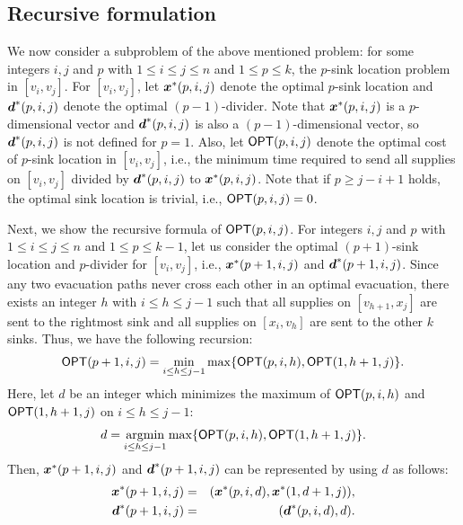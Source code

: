 \documentclass[a4paper]{llncs}
\newcommand{\bm}[1]{\mbox{\boldmath{$#1$}}}
\newcommand{\argmin}{\operatornamewithlimits{argmin}}
\begin{document}
\subsection{Recursive formulation}
We now consider a subproblem of the above mentioned problem:
for some integers $i, j$ and $p$ with $1 \le i \le j \le n$ and $1 \le p \le k$, the $p$-sink location problem in $[v_i, v_j]$.
For $[v_i, v_j]$, let ${\bm x}^*(p, i, j)$ denote the optimal $p$-sink location and ${\bm d}^*(p, i, j)$ denote the optimal $(p-1)$-divider.
Note that ${\bm x}^*(p, i, j)$ is a $p$-dimensional vector and ${\bm d}^*(p, i, j)$ is also a $(p-1)$-dimensional vector,
so ${\bm d}^*(p, i, j)$ is not defined for $p=1$.
Also, let ${\sf OPT}(p, i, j)$ denote the optimal cost of $p$-sink location in $[v_i, v_j]$, 
i.e., the minimum time required to send all supplies on $[v_i, v_j]$ divided by ${\bm d}^*(p, i, j)$ to ${\bm x}^*(p, i, j)$.
Note that if $p \ge j-i+1$ holds, the optimal sink location is trivial, i.e., ${\sf OPT}(p, i, j) = 0$.

Next, we show the recursive formula of ${\sf OPT}(p, i, j)$.
For integers $i, j$ and $p$ with $1 \le i \le j \le n$ and $1 \le p \le k-1$,
let us consider the optimal $(p+1)$-sink location and $p$-divider for $[v_i, v_j]$, i.e., ${\bm x}^*(p+1, i, j)$ and ${\bm d}^*(p+1, i, j)$.
Since any two evacuation paths never cross each other in an optimal evacuation,
there exists an integer $h$ with $i \le h \le j-1$ such that
all supplies on $[v_{h+1}, x_j]$ are sent to the rightmost sink
and all supplies on $[x_i, v_h]$ are sent to the other $k$ sinks.
Thus, we have the following recursion: 
\begin{eqnarray}
{\sf OPT}(p+1, i, j) = \min_{i \le h \le j-1} \max \{ {\sf OPT}(p, i, h), {\sf OPT}(1, h+1, j) \}.
\label{eq0.0}
\end{eqnarray}
Here, let $d$ be an integer which minimizes the maximum of ${\sf OPT}(p, i, h)$ and ${\sf OPT}(1, h+1, j)$ on $i \le h \le j-1$:
\begin{eqnarray}
d = \argmin_{i \le h \le j-1} \max \{ {\sf OPT}(p, i, h), {\sf OPT}(1, h+1, j) \}.
\label{eq0.1}
\end{eqnarray}
Then, ${\bm x}^*(p+1, i, j)$ and ${\bm d}^*(p+1, i, j)$ can be represented by using $d$ as follows:
\begin{eqnarray}
{\bm x}^*(p+1, i, j) &=& ({\bm x}^*(p, i, d), {\bm x}^*(1, d+1, j)), \label{eq0.2} \\
{\bm d}^*(p+1, i, j) &=& ({\bm d}^*(p, i, d), d). \label{eq0.3}
\end{eqnarray}
\end{document}
